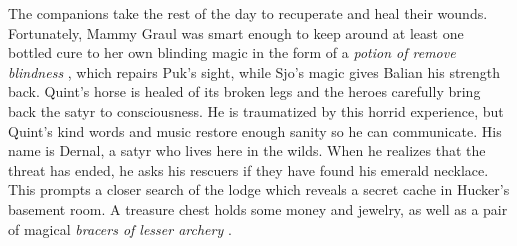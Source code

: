 The companions take the rest of the day to recuperate and heal their wounds. Fortunately, Mammy Graul was smart enough to keep around at least one bottled cure to her own blinding magic in the form of a {\itshape potion of remove blindness} , which repairs Puk's sight, while Sjo's magic gives Balian his strength back. Quint's horse is healed of its broken legs and the heroes carefully bring back the satyr to consciousness. He is traumatized by this horrid experience, but Quint's kind words and music restore enough sanity so he can communicate. His name is Dernal, a satyr who lives here in the wilds. When he realizes that the threat has ended, he asks his rescuers if they have found his emerald necklace. This prompts a closer search of the lodge which reveals a secret cache in Hucker's basement room. A treasure chest holds some money and jewelry, as well as a pair of magical  {\itshape bracers of lesser archery} . 